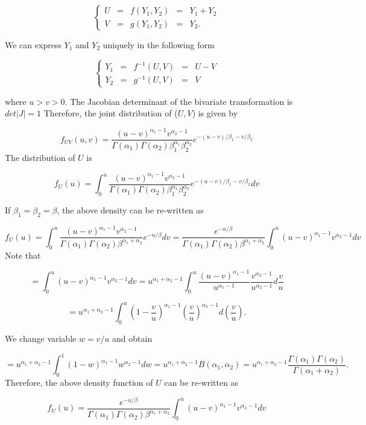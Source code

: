 \documentclass[
]{book}
\begin{document}
\[
\left\{
\begin{array}{rrrrr}
   U & = & f(Y_1, Y_2) & = & Y_1 + Y_2 \\
   V & = & g(Y_1, Y_2) & = & Y_2.
\end{array}\right.
\]

We can express \(Y_1\) and \(Y_2\) uniquely in the following form

\[
\left\{
\begin{array}{rrrrr}
   Y_1 & = & f^{-1}(U, V) & = & U - V\\
   Y_2 & = & g^{-1}(U, V) & = & V
\end{array}\right.
\]

where \(u > v > 0\). The Jacobian determinant of the bivariate transformation is \(det|J| = 1\) Therefore, the joint distribution of (\(U, V\)) is given by

\[
f_{UV}(u,v) = \frac{(u-v)^{\alpha_1-1}v^{\alpha_2-1}}{\Gamma(\alpha_1)\Gamma(\alpha_2)\beta_1^{\alpha_1}\beta_2^{\alpha_2}}e^{-(u-v)/\beta_1 -v/\beta_2}
\]
The distribution of \(U\) is

\[
f_U(u) = \int_0^u \frac{(u-v)^{\alpha_1-1}v^{\alpha_2-1}}{\Gamma(\alpha_1)\Gamma(\alpha_2)\beta_1^{\alpha_1}\beta_2^{\alpha_2}}e^{-(u-v)/\beta_1 -v/\beta_2} dv
\]

If \(\beta_1 = \beta_2 = \beta\), the above density can be re-written as

\[
f_U(u) = \int_0^u \frac{(u-v)^{\alpha_1-1}v^{\alpha_2-1}}{\Gamma(\alpha_1)\Gamma(\alpha_2)\beta^{\alpha_1+\alpha_2}}e^{-u/\beta } dv = \frac{e^{-u/\beta }}{\Gamma(\alpha_1)\Gamma(\alpha_2)\beta^{\alpha_1+\alpha_2}} \int_0^u (u-v)^{\alpha_1-1}v^{\alpha_2-1} dv
\]
Note that

\[
=\int_0^u (u-v)^{\alpha_1-1}v^{\alpha_2-1} dv = u^{\alpha_1+\alpha_2-1}\int_0^u\frac{(u-v)^{\alpha_1-1}}{u^{\alpha_1-1}}\frac{v^{\alpha_2-1}}{u^{\alpha_2-1}}d\frac{v}{u}
\]

\[
=u^{\alpha_1+\alpha_2-1}\int_0^u \left(1-\frac{v}{u} \right)^{\alpha_1-1} \left(\frac{v}{u}\right)^{\alpha_2-1}d \left(\frac{v}{u}\right).
\]

We change variable \(w = v/u\) and obtain

\[
=u^{\alpha_1+\alpha_2-1}\int_0^1 \left(1-w \right)^{\alpha_1-1} w^{\alpha_2-1}d w = u^{\alpha_1+\alpha_2-1} B(\alpha_1, \alpha_2) = u^{\alpha_1+\alpha_2-1}\frac{\Gamma(\alpha_1)\Gamma(\alpha_2)}{\Gamma(\alpha_1+\alpha_2)}.
\]
Therefore, the above density function of \(U\) can be re-written as

\[
f_U(u)= \frac{e^{-u/\beta }}{\Gamma(\alpha_1)\Gamma(\alpha_2)\beta^{\alpha_1+\alpha_2}} \int_0^u (u-v)^{\alpha_1-1}v^{\alpha_2-1} dv
\]
\end{document}
